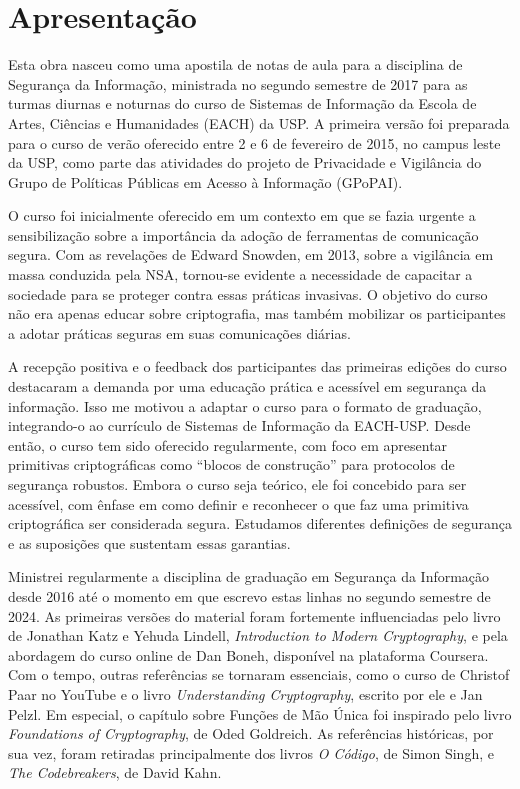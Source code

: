 ﻿\chapter*{Apresentação}

Esta obra nasceu como uma apostila de notas de aula para a disciplina de Segurança da Informação, ministrada no segundo semestre de 2017 para as turmas diurnas e noturnas do curso de Sistemas de Informação da Escola de Artes, Ciências e Humanidades (EACH) da USP.
A primeira versão foi preparada para o curso de verão oferecido entre 2 e 6 de fevereiro de 2015, no campus leste da USP, como parte das atividades do projeto de Privacidade e Vigilância do Grupo de Políticas Públicas em Acesso à Informação (GPoPAI).

O curso foi inicialmente oferecido em um contexto em que se fazia urgente a sensibilização sobre a importância da adoção de ferramentas de comunicação segura.
Com as revelações de Edward Snowden, em 2013, sobre a vigilância em massa conduzida pela NSA, tornou-se evidente a necessidade de capacitar a sociedade para se proteger contra essas práticas invasivas. O objetivo do curso não era apenas educar sobre criptografia, mas também mobilizar os participantes a adotar práticas seguras em suas comunicações diárias.

A recepção positiva e o feedback dos participantes das primeiras edições do curso destacaram a demanda por uma educação prática e acessível em segurança da informação. Isso me motivou a adaptar o curso para o formato de graduação, integrando-o ao currículo de Sistemas de Informação da EACH-USP.
Desde então, o curso tem sido oferecido regularmente, com foco em apresentar primitivas criptográficas como ``blocos de construção'' para protocolos de segurança robustos.
Embora o curso seja teórico, ele foi concebido para ser acessível, com ênfase em como definir e reconhecer o que faz uma primitiva criptográfica ser considerada segura.
Estudamos diferentes definições de segurança e as suposições que sustentam essas garantias.

Ministrei regularmente a disciplina de graduação em Segurança da Informação desde 2016 até o momento em que escrevo estas linhas no segundo semestre de 2024.
As primeiras versões do material foram fortemente influenciadas pelo livro de Jonathan Katz e Yehuda Lindell, {\em Introduction to Modern Cryptography}, e pela abordagem do curso online de Dan Boneh, disponível na plataforma Coursera.
Com o tempo, outras referências se tornaram essenciais, como o curso de Christof Paar no YouTube e o livro {\em Understanding Cryptography}, escrito por ele e Jan Pelzl.
Em especial, o capítulo sobre Funções de Mão Única foi inspirado pelo livro {\em Foundations of Cryptography}, de Oded Goldreich.
As referências históricas, por sua vez, foram retiradas principalmente dos livros {\em O Código}, de Simon Singh, e {\em The Codebreakers}, de David Kahn.

